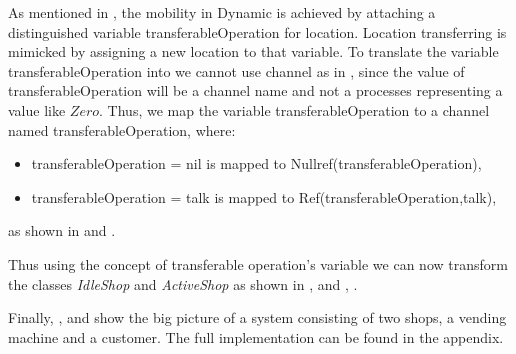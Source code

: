 As mentioned in , the mobility in Dynamic \oz{} is achieved
by attaching a distinguished variable transferableOperation for location. Location transferring
is mimicked by assigning a new location to that variable. To translate the variable transferableOperation into \picalc{} we cannot use \picalc{} channel as in , since the value of transferableOperation will be a channel name and not a processes representing a value like $Zero$. Thus, we map the variable transferableOperation to a channel named transferableOperation, where:

\begin{itemize}
\item transferableOperation = nil is mapped to Nullref(transferableOperation),

\item transferableOperation = talk is mapped to Ref(transferableOperation,talk),
\end{itemize}
as shown in  and .

Thus using the concept of transferable operation's variable we can now transform the classes \textit{IdleShop} and \textit{ActiveShop} as shown in ,  and , .



Finally, ,  and  show the big picture of a system consisting of two shops, a vending machine and a customer. The full implementation can be found in the appendix.
